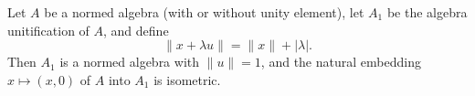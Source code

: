 Let $A$ be a normed algebra (with or without unity element), let $A_1$ be the algebra unitification of $A$, and define
$$
\|x + \lambda u\| = \|x\| + |\lambda|.
$$
Then $A_1$ is a normed algebra with $\|u\| = 1$, and the natural embedding $x \mapsto (x, 0)$ of $A$ into $A_1$ is isometric.
